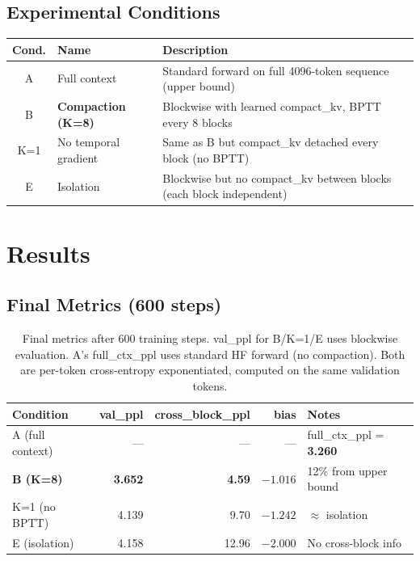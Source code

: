 \documentclass[11pt]{article}
\begin{document}
\subsection{Experimental Conditions}

\begin{table}[H]
\centering
\begin{tabular}{clp{8cm}}
\toprule
Cond. & Name & Description \\
\midrule
A & Full context & Standard forward on full 4096-token sequence (upper bound) \\
B & \textbf{Compaction (K=8)} & Blockwise with learned compact\_kv, BPTT every 8 blocks \\
K=1 & No temporal gradient & Same as B but compact\_kv detached every block (no BPTT) \\
E & Isolation & Blockwise but no compact\_kv between blocks (each block independent) \\
\bottomrule
\end{tabular}
\end{table}

\section{Results}

\subsection{Final Metrics (600 steps)}

\begin{table}[H]
\centering
\begin{tabular}{lrrrl}
\toprule
Condition & val\_ppl & cross\_block\_ppl & bias & Notes \\
\midrule
A (full context) & --- & --- & --- & full\_ctx\_ppl = \textbf{3.260} \\
\textbf{B (K=8)} & \textbf{3.652} & \textbf{4.59} & $-1.016$ & 12\% from upper bound \\
K=1 (no BPTT) & 4.139 & 9.70 & $-1.242$ & $\approx$ isolation \\
E (isolation) & 4.158 & 12.96 & $-2.000$ & No cross-block info \\
\bottomrule
\end{tabular}
\caption{Final metrics after 600 training steps. val\_ppl for B/K=1/E uses blockwise evaluation.
A's full\_ctx\_ppl uses standard HF forward (no compaction). Both are per-token cross-entropy
exponentiated, computed on the same validation tokens.}
\end{table}
\end{document}
